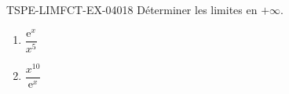 \begin{exercice}{TSPE-LIMFCT-EX-040}{1}{8}
Déterminer les limites en $+\infty$.
\begin{enumerate}
  \item $\dfrac{\mathrm{e}^x}{x^5}$
  \item $\dfrac{x^{10}}{\mathrm{e}^x}$
\end{enumerate}
\end{exercice}
